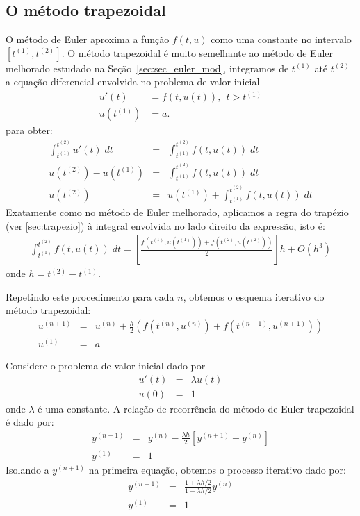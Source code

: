 \subsection{O método trapezoidal}\label{sec:trapezoidal}
O método de Euler aproxima a função $f(t,u)$ como uma constante no intervalo $[t^{(1)},t^{(2)}]$. O método trapezoidal é muito semelhante ao método de Euler melhorado estudado na Seção~\ref{sec:sec_euler_mod}, integramos de $t^{(1)}$ até $t^{(2)}$ a equação diferencial envolvida no problema de valor inicial
\begin{equation}\label{eq:EDO}
  \begin{split}
    u'(t)  &= f(t,u(t)),~~t>t^{(1)} \\
    u(t^{(1)}) &= a.
  \end{split}
\end{equation}
para obter:
\begin{eqnarray}
  \int_{t^{(1)}}^{t^{(2)}} u'(t) \;dt &=& \int_{t^{(1)}}^{t^{(2)}} f(t,u(t)) \; dt\\
  u(t^{(2)})-u(t^{(1)})               &=& \int_{t^{(1)}}^{t^{(2)}} f(t,u(t)) \; dt\\
  u(t^{(2)})                      &=& u(t^{(1)}) +  \int _{t^{(1)}}^{t^{(2)}} f(t,u(t)) \; dt
\end{eqnarray}
Exatamente como no método de Euler melhorado, aplicamos a regra do trapézio (ver \ref{sec:trapezio}) à integral envolvida no lado direito da expressão, isto é:
\begin{eqnarray}
\int _{t^{(1)}}^{t^{(2)}} f(t,u(t)) \; dt = \left[\frac{f\left(t^{(1)},u(t^{(1)})\right)+f\left(t^{(2)},u(t^{(2)})\right)}{2}\right]h + O(h^3)
\end{eqnarray}
onde $h=t^{(2)}-t^{(1)}$.

Repetindo este procedimento para cada $n$, obtemos o esquema iterativo do método trapezoidal:
\begin{eqnarray}
  u^{(n+1)} &=& u^{(n)} +  \frac{h}{2} \left(f(t^{(n)},u^{(n)})+f(t^{(n+1)},u^{(n+1)})\right)\\
  u^{(1)} &=&a
\end{eqnarray}


\begin{ex} Considere o problema de valor inicial dado por
\begin{eqnarray}
u'(t)&=& \lambda u(t) \\
u(0)&=&1
\end{eqnarray}
onde $\lambda$ é uma constante. A relação de recorrência do método de Euler trapezoidal é dado por:
\begin{eqnarray}
 y^{(n+1)}&=&y^{(n)}-\frac{\lambda h}{2} \left[y^{(n+1)}+y^{(n)}\right]\\
 y^{(1)}&=&1
\end{eqnarray}
Isolando a $y^{(n+1)}$ na primeira equação, obtemos o processo iterativo dado por:
\begin{eqnarray}
 y^{(n+1)}&=&\frac{1+ \lambda h/2}{1-\lambda h/2}y^{(n)}\\
 y^{(1)}&=&1
\end{eqnarray}
\end{ex}

